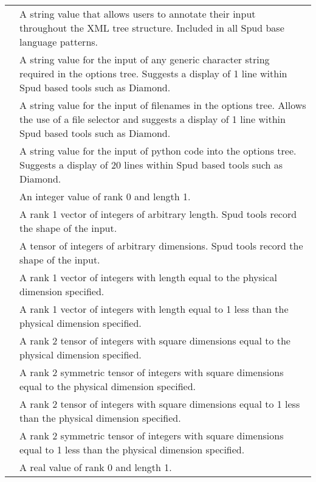 \documentclass[a4paper, 11pt]{book}
\begin{document}
\noindent\begin{longtable}{lp{8cm}}
\lstinline *comment* & A string value that allows users to annotate their input throughout the XML tree structure.  Included in all Spud base language patterns. \\
\lstinline *anystring* & A string value for the input of any generic character string required in the options tree.  Suggests a display of 1 line within Spud based tools such as Diamond. \\
\lstinline *filename* & A string value for the input of filenames in the options tree.  Allows the use of a file selector and suggests a display of 1 line within Spud based tools such as Diamond. \\
\lstinline *python_code* & A string value for the input of python code into the options tree.  Suggests a display of 20 lines within Spud based tools such as Diamond. \\
\lstinline *integer* & An integer value of rank 0 and length 1. \\
\lstinline *integer_vector* & A rank 1 vector of integers of arbitrary length.  Spud tools record the shape of the input. \\
\lstinline *integer_tensor* & A tensor of integers of arbitrary dimensions.  Spud tools record the shape of the input. \\
\lstinline *integer_dim_vector* & A rank 1 vector of integers with length equal to the physical dimension specified. \\
\lstinline *integer_dim_minus_one_vector* & A rank 1 vector of integers with length equal to 1 less than the physical dimension specified. \\
\lstinline *integer_dim_tensor* & A rank 2 tensor of integers with square dimensions equal to the physical dimension specified. \\
\lstinline *integer_dim_symmetric_tensor* & A rank 2 symmetric tensor of integers with square dimensions equal to the physical dimension specified. \\
\lstinline *integer_dim_minus_one_tensor* & A rank 2 tensor of integers with square dimensions equal to 1 less than the physical dimension specified. \\
\lstinline *integer_dim_minus_one_symmetric_tensor* & A rank 2 symmetric tensor of integers with square dimensions equal to 1 less than the physical dimension specified. \\
\lstinline *real* & A real value of rank 0 and length 1. \\

\end{longtable}
\end{document}
